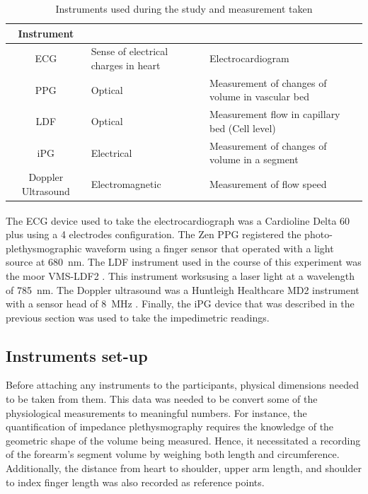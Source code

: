 \begin{table}
	\caption{Instruments used during the study and measurement taken}
	\centering
	\label{table:instruments}
	\begin{tabular}{cp{}p{}}
		\toprule
		\textbf{Instrument} & \centering{\textbf{Method}} & \centering{\textbf{Measurement}} \tabularnewline \midrule
		ECG & Sense of electrical charges in heart & Electrocardiogram \tabularnewline \midrule
		PPG & Optical & Measurement of changes of volume in vascular bed \tabularnewline \midrule
		LDF & Optical & Measurement flow in capillary bed (Cell level) \tabularnewline \midrule
		iPG& Electrical & Measurement of changes of volume in a segment \tabularnewline \midrule
		Doppler Ultrasound & Electromagnetic & Measurement of flow speed \tabularnewline \midrule
	\end{tabular}  
\end{table}

The ECG device used to take the electrocardiograph was a Cardioline\textsuperscript{\textregistered} Delta 60 plus \cite{remco:delta60} using a 4 electrodes configuration. The Zen PPG registered the photo-plethysmographic waveform using a finger sensor that operated with a light source at \SI{680}{\nano\meter}. The LDF instrument used in the course of this experiment was the moor VMS-LDF2 \cite{moor:LDF2}. This instrument worksusing a laser light at a wavelength of \SI{785}{\nano\meter}. The Doppler ultrasound was a Huntleigh Healthcare MD2 instrument with a sensor head of \SI{8}{\mega\hertz} \cite{ht:MD2}. Finally, the iPG device that was described in the previous section was used to take the impedimetric readings. 

\subsection{Instruments set-up}
\label{section procedure 1.1}

Before attaching any instruments to the participants, physical dimensions needed to be taken from them. This data was needed to be convert some of the physiological measurements to meaningful numbers. For instance, the quantification of impedance plethysmography requires the knowledge of the geometric shape of the volume being measured. Hence, it necessitated a recording of the forearm's segment volume by weighing both length and circumference. Additionally, the distance from heart to shoulder, upper arm length, and shoulder to index finger length was also recorded as reference points. 

